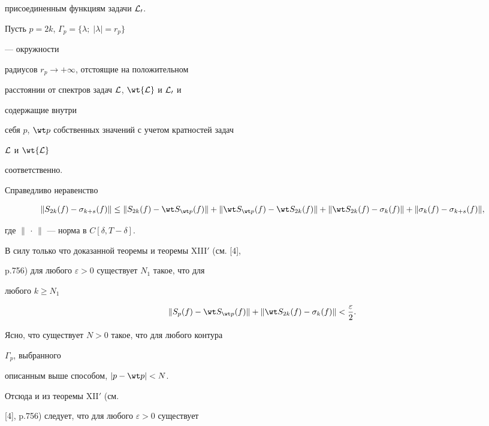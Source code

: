 присоединенным функциям задачи $\cal L_0$.





Пусть $p=2k$, $\Gamma_p=\{\lambda;\;|\lambda|=r_p\}$


--- окружности


радиусов $r_p\to +\infty$, отстоящие на положительном


расстоянии от спектров задач $\cal L$, $\wt{\cal L}$ и $\cal L_0$ и


содержащие внутри


себя $p$, $\wt p$ собственных значений с учетом кратностей задач


$\cal L$ и $\wt{\cal L}$


соответственно.





Справедливо неравенство


$$


\|S_{2k}(f)-\sigma_{k+s}(f)\|\le \|S_{2k}(f)-


\wt S_{\wt p}(f)\|+ \|\wt S_{\wt p}(f)-\wt S_{2k}(f)\|+


\|\wt S_{2k}(f)-\sigma_k(f)\|+


\|\sigma_k(f)-\sigma_{k+s}(f)\|,


$$


где $\|\,\cdot\,\|$ --- норма в $C[\delta,T-\delta]$.





В силу только что доказанной теоремы и теоремы XIII${}'$ (см. [4],


p.756) для любого $\varepsilon>0$ существует $N_1$ такое, что для


любого $k\ge N_1$


$$


\|S_p(f)-\wt S_{\wt p}(f)\|+\|\wt S_{2k}(f)-\sigma_k(f)\|<


\frac{\varepsilon}{2}.


$$





Ясно, что существует $N>0$ такое, что для любого контура


$\Gamma_p$, выбранного


описанным выше способом, $|p-\wt p|<N$.


Отсюда и из теоремы XII${}'$ (см.


[4], p.756) следует, что для любого $\varepsilon>0$ существует


